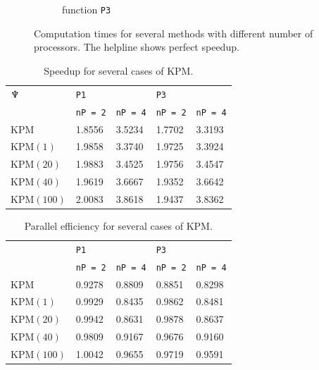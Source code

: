 \begin{figure}[H]
\begin{subfigure}[b]{0.45\textwidth}
                \caption{function \texttt{P3}}
                \label{fig:speed2}
        \end{subfigure}
        \caption{Computation times for several methods with different number of processors. The helpline shows perfect speedup.}\label{fig:speed}

\end{figure}

\begin{table}[H]
\centering
\begin{tabular}{l | l l | l l}
$\neptune$ %
 &\texttt{P1} & & \texttt{P3} & \\
&\texttt{nP = 2} & \texttt{nP = 4} & \texttt{nP = 2} & \texttt{nP = 4} \\
\hline
KPM & 1.8556  &  3.5234 & 1.7702&    3.3193\\
KPM$(1)$ & 1.9858  &  3.3740 & 1.9725&    3.3924\\
KPM$(20)$ & 1.9883  &  3.4525 & 1.9756&    3.4547\\
KPM$(40)$ & 1.9619  &  3.6667 & 1.9352&   3.6642\\
KPM$(100)$ & 2.0083  &  3.8618 & 1.9437&    3.8362\\
\end{tabular}
\caption{Speedup for several cases of KPM.}
\label{tab:speedup}
\end{table}

\begin{table}[H]
\centering
\begin{tabular}{l | l l | l l}
&\texttt{P1} & & \texttt{P3} & \\
&\texttt{nP = 2} & \texttt{nP = 4} & \texttt{nP = 2} & \texttt{nP = 4} \\
\hline
KPM & 0.9278  &  0.8809 & 0.8851&    0.8298\\
KPM$(1)$ &  0.9929  &  0.8435 & 0.9862 &   0.8481\\
KPM$(20)$ & 0.9942  &  0.8631 & 0.9878&    0.8637\\
KPM$(40)$ & 0.9809  &  0.9167 & 0.9676&    0.9160\\
KPM$(100)$ & 1.0042  &  0.9655 & 0.9719&    0.9591\\
\end{tabular}
\caption{Parallel efficiency for several cases of KPM. }
\label{tab:eff}
\end{table}

